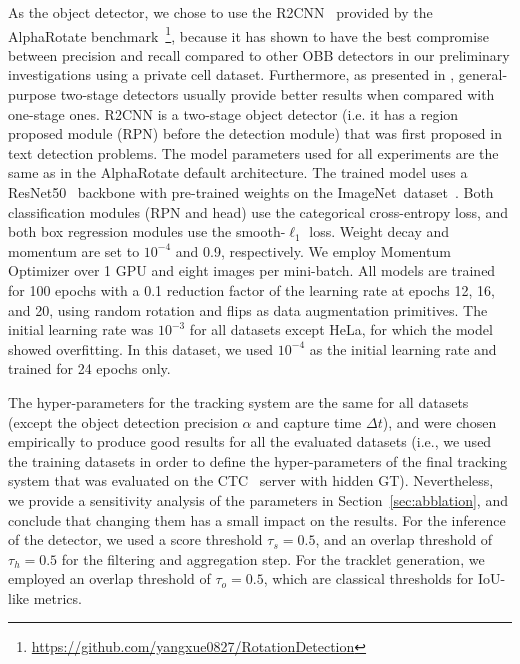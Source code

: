 \documentclass{article}
\begin{document}
As the object detector, we chose to use the R2CNN~\cite{r2cnn} provided by the AlphaRotate benchmark~\footnote{\url{https://github.com/yangxue0827/RotationDetection}}, because it has shown to have the best compromise between precision and recall compared to other OBB detectors in our preliminary investigations using a private cell dataset. Furthermore, as presented in \cite{liu2020deep}, general-purpose two-stage detectors usually provide better results when compared with one-stage ones. R2CNN is a two-stage object detector (i.e. it has a region proposed module (RPN) before the detection module) that was first proposed in text detection problems. The model parameters used for all experiments are the same as in the AlphaRotate default architecture. The trained model uses a ResNet50~\cite{resnet} backbone with pre-trained weights on the ImageNet~dataset~\cite{imagenet}. Both classification modules (RPN and head) use the categorical cross-entropy loss, and both box regression modules use the smooth-$\ell_1$ loss. Weight decay and momentum are set to $10^{-4}$ and 0.9, respectively. We employ Momentum Optimizer over 1 GPU and eight images per mini-batch. All models are trained for 100 epochs with a 0.1 reduction factor of the learning rate at epochs 12, 16, and 20, using random rotation and flips as data augmentation primitives. The initial learning rate was $10^{-3}$ for all datasets except HeLa, for which the model showed overfitting. In this dataset, we used $10^{-4}$ as the initial learning rate and trained for 24 epochs only.

The hyper-parameters for the tracking system are the same for all datasets (except the object detection precision $\alpha$  and capture time $\Delta t$), and were chosen empirically to produce good results for all the evaluated datasets (i.e., we used the training datasets in order to define the hyper-parameters of the final tracking system that was evaluated on the CTC~\cite{isbi} server with hidden GT). Nevertheless, we provide a sensitivity analysis of the parameters in Section~\ref{sec:abblation}, and conclude that changing them has a small impact on the results. For the inference of the detector, we used a score threshold $\tau_s=0.5$, and an overlap threshold of $\tau_h=0.5$ for the filtering and aggregation step. For the tracklet generation, we employed an overlap threshold of $\tau_o=0.5$, which are classical thresholds for IoU-like metrics.
\end{document}
